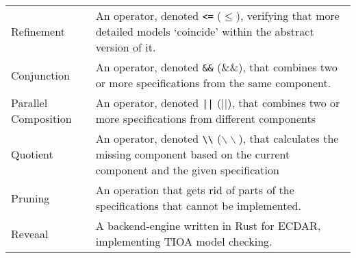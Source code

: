 {\begin{xltabular}{\linewidth}[H]{>{\aautstyle}l|X}
    Refinement & An operator, denoted \texttt{<=} ($\leq$), verifying that more detailed models `coincide' within the abstract version of it. \\
    Conjunction & An operator, denoted \texttt{\&\&} ($\&\&$), that combines two or more specifications from the same component.\\
    Parallel Composition & An operator, denoted \texttt{||} ($||$), that combines two or more specifications from different components \\
    Quotient & An operator, denoted \texttt{\textbackslash\textbackslash} ($\backslash\backslash$), that calculates the missing component based on the current component and the given specification \\
    Pruning & An operation that gets rid of parts of the specifications that cannot be implemented.\\
    Reveaal & A backend-engine written in Rust for ECDAR, implementing TIOA model checking.
    \label{tab:glossary}
\end{xltabular}}
